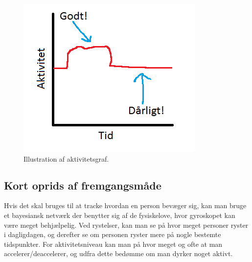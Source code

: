 \begin{figure}
	\centering
	\includegraphics{graphics/aktivitet_billed}
	\caption{Illustration af aktivitetsgraf.}\label{aktivitetsgraf}
\end{figure}


\subsection{Kort oprids af fremgangsmåde} 
Hvis det skal bruges til at tracke hvordan en person bevæger sig, kan man bruge et bayesiansk netværk der benytter sig af de fysiskelove, hvor gyroskopet kan være meget behjælpelig. Ved rystelser, kan man se på hvor meget personer ryster i dagligdagen, og derefter se om personen ryster mere på nogle bestemte tidspunkter. For aktivitetsniveau kan man på hvor meget og ofte at man accelerer/deaccelerer, og udfra dette bedømme om man dyrker noget aktivt.